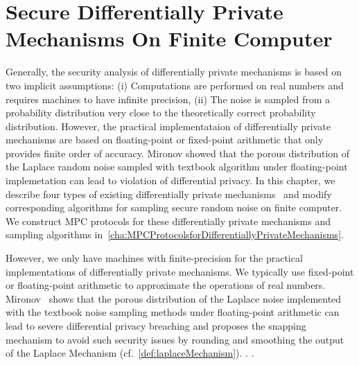 \chapter{Secure Differentially Private Mechanisms On Finite Computer}
\label{cha:secureDPMechanisms}

Generally, the security analysis of differentially private mechanisms is based on two implicit assumptions: (i) Computations are performed on real numbers and requires machines to have infinite precision, (ii) The noise is sampled from a probability distribution very close to the theoretically correct probability distribution. However, the practical implementataion of differentially private mechanisms are based on floating-point or fixed-point arithmetic that only provides finite order of accuracy. Mironov \cite{mironov2012significance} showed that the porous distribution of the Laplace random noise sampled with textbook algorithm under floating-point implemetation can lead to violation of differential privacy. In this chapter, we describe four types of existing differentially private mechanisms~\cite{mironov2012significance,googleDP2019,ghosh2012universally,canonne2020discrete} and modify corresponding algorithms for sampling secure random noise on finite computer. We construct MPC protocols for these differentially private mechanisms and sampling algorithms in~\autoref{cha:MPCProtocolsforDifferentiallyPrivateMechanisms}.









However, we only have machines with finite-precision for the practical implementations of differentially private mechanisms. We typically use fixed-point or floating-point arithmetic to approximate the operations of real numbers. Mironov~\cite{mironov2012significance} shows that the porous distribution of the Laplace noise implemented with the textbook noise sampling methods under floating-point arithmetic can lead to severe differential privacy breaching and proposes the snapping mechanism to avoid such security issues by rounding and smoothing the output of the Laplace Mechanism (cf.~\autoref{def:laplaceMechanism}). . .


